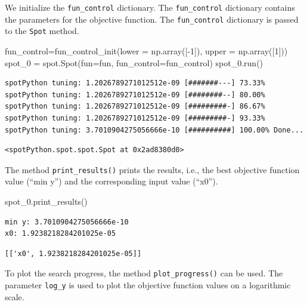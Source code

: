 \documentclass[
  letterpaper,
  DIV=11,
  numbers=noendperiod]{scrreprt}
\newenvironment{Shaded}{\begin{snugshade}}{\end{snugshade}}
\newcommand{\DecValTok}[1]{\textcolor[rgb]{0.68,0.00,0.00}{#1}}
\newcommand{\NormalTok}[1]{\textcolor[rgb]{0.00,0.23,0.31}{#1}}
\newcommand{\OperatorTok}[1]{\textcolor[rgb]{0.37,0.37,0.37}{#1}}
\begin{document}
We initialize the \texttt{fun\_control} dictionary. The
\texttt{fun\_control} dictionary contains the parameters for the
objective function. The \texttt{fun\_control} dictionary is passed to
the \texttt{Spot} method.

\begin{Shaded}
\begin{Highlighting}[]
\NormalTok{fun\_control}\OperatorTok{=}\NormalTok{fun\_control\_init(lower }\OperatorTok{=}\NormalTok{ np.array([}\OperatorTok{{-}}\DecValTok{1}\NormalTok{]),}
\NormalTok{                     upper }\OperatorTok{=}\NormalTok{ np.array([}\DecValTok{1}\NormalTok{]))}
\NormalTok{spot\_0 }\OperatorTok{=}\NormalTok{ spot.Spot(fun}\OperatorTok{=}\NormalTok{fun,}
\NormalTok{                   fun\_control}\OperatorTok{=}\NormalTok{fun\_control)}
\NormalTok{spot\_0.run()}
\end{Highlighting}
\end{Shaded}

\begin{verbatim}
spotPython tuning: 1.2026789271012512e-09 [#######---] 73.33% 
spotPython tuning: 1.2026789271012512e-09 [########--] 80.00% 
spotPython tuning: 1.2026789271012512e-09 [#########-] 86.67% 
spotPython tuning: 1.2026789271012512e-09 [#########-] 93.33% 
spotPython tuning: 3.7010904275056666e-10 [##########] 100.00% Done...
\end{verbatim}

\begin{verbatim}
<spotPython.spot.spot.Spot at 0x2ad8380d0>
\end{verbatim}

The method \texttt{print\_results()} prints the results, i.e., the best
objective function value (``min y'') and the corresponding input value
(``x0'').

\begin{Shaded}
\begin{Highlighting}[]
\NormalTok{spot\_0.print\_results()}
\end{Highlighting}
\end{Shaded}

\begin{verbatim}
min y: 3.7010904275056666e-10
x0: 1.9238218284201025e-05
\end{verbatim}

\begin{verbatim}
[['x0', 1.9238218284201025e-05]]
\end{verbatim}

To plot the search progress, the method \texttt{plot\_progress()} can be
used. The parameter \texttt{log\_y} is used to plot the objective
function values on a logarithmic scale.
\end{document}
